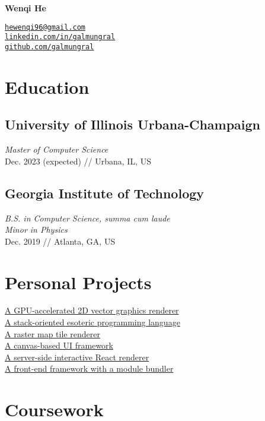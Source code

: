 \documentclass[11pt,twocolumn]{article}
\begin{document}
{\Huge\bf Wenqi He}

\vspace{10pt}
\href{mailto:hewenqi96@gmail.com}{\texttt{hewenqi96@gmail.com}}\\
\href{https://linkedin.com/in/galmungral}{\texttt{linkedin.com/in/galmungral}}\\
\href{https://github.com/galmungral}{\texttt{github.com/galmungral}}


\section*{\textsf{Education}}

\subsection*{University of Illinois Urbana-Champaign}
\textit{Master of Computer Science}\\
Dec. 2023 (expected) // Urbana, IL, US

\subsection*{Georgia Institute of Technology}
\textit{B.S. in Computer Science, summa cum laude}\\
\textit{Minor in Physics}\\
Dec. 2019 // Atlanta, GA, US

\section*{\textsf{Personal Projects}}

\href{https://github.com/galmungral/polyrender}{A GPU-accelerated 2D vector graphics renderer}\\
\href{https://github.com/galmungral/hanbun-lang}{A stack-oriented esoteric programming language} \\
\href{https://github.com/galmungral/mercator}{A raster map tile renderer}\\
\href{https://github.com/galmungral/michelangelo}{A canvas-based UI framework}\\
\href{https://github.com/galmungral/react-teletype}{A server-side interactive React renderer} \\
\href{https://github.com/galmungral/replay}{A front-end framework with a module bundler}

\section*{\textsf{Coursework}}
\end{document}
